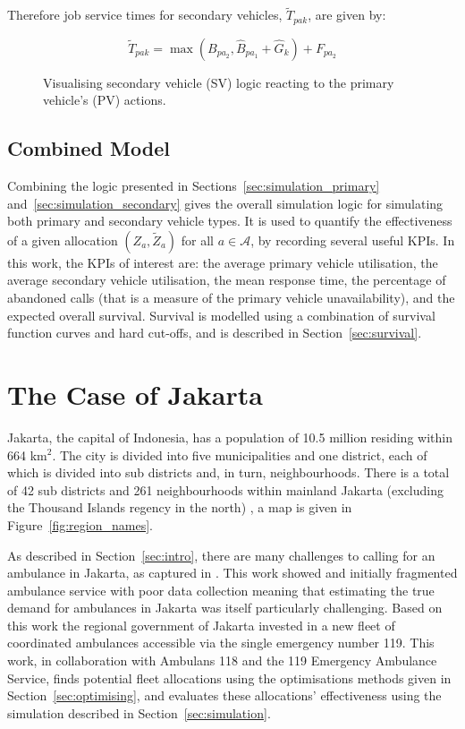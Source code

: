\documentclass[preprint,12pt]{elsarticle}
\begin{document}
Therefore job service times for secondary vehicles, $\tilde{T}_{pak}$, are
given by:

\begin{equation}
  \tilde{T}_{pak} = \max\left(B_{pa_2}, \hat{B}_{pa_1} + \hat{G}_k \right) + F_{pa_2}
\end{equation}

\begin{figure}
    \centering
    
    \caption{Visualising secondary vehicle (SV) logic reacting to the primary
    vehicle's (PV) actions.}
    \label{fig:sequential_logic}
\end{figure}

\subsection{Combined Model}
Combining the logic presented in Sections~\ref{sec:simulation_primary}
and~\ref{sec:simulation_secondary} gives the overall simulation logic for
simulating both primary and secondary vehicle types. It is used to quantify
the effectiveness of a given allocation $(Z_a, \tilde{Z}_a)$ for all
$a \in \mathcal{A}$, by recording several useful KPIs.
In this work, the KPIs of interest are: the average primary vehicle
utilisation, the average secondary vehicle utilisation, the mean response
time, the percentage of abandoned calls (that is a measure of the primary
vehicle unavailability), and the expected overall survival. Survival is
modelled using a combination of survival function curves and hard cut-offs,
and is described in Section~\ref{sec:survival}.



\section{The Case of Jakarta}\label{sec:jakarta}
Jakarta, the capital of Indonesia, has a population of 10.5 million
\cite{BPS_Jakarta} residing within 664 km$^2$. The city is divided into five
municipalities and one district, each of which is divided into sub districts
and, in turn, neighbourhoods. There is a total of 42 sub districts and 261
neighbourhoods within mainland Jakarta (excluding the Thousand Islands regency
in the north) \cite{BPS_Jakarta_angka}, a map is given in
Figure~\ref{fig:region_names}. 

As described in Section~\ref{sec:intro}, there are many challenges to calling
for an ambulance in Jakarta, as captured in \cite{BriceSyaribahNoor2022Esui}.
This work showed and initially fragmented ambulance service with poor data
collection meaning that estimating the true demand for ambulances in Jakarta
was itself particularly challenging.
Based on this work the regional government of Jakarta invested in a new fleet
of coordinated ambulances accessible via the single emergency number 119.
This work, in collaboration with Ambulans 118 and the 119 Emergency Ambulance
Service, finds potential fleet allocations using the optimisations methods
given in Section~\ref{sec:optimising}, and evaluates these allocations'
effectiveness using the simulation described in Section~\ref{sec:simulation}.
\end{document}
